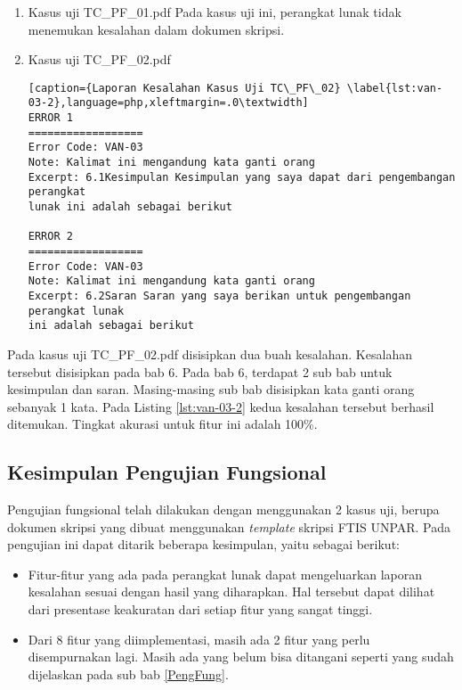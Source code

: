\begin{enumerate}
	\item Kasus uji TC\_PF\_01.pdf \newline
	Pada kasus uji ini, perangkat lunak tidak menemukan kesalahan dalam dokumen skripsi.
	
	\item Kasus uji TC\_PF\_02.pdf
	
\begin{lstlisting}[caption={Laporan Kesalahan Kasus Uji TC\_PF\_02}	\label{lst:van-03-2},language=php,xleftmargin=.0\textwidth]
ERROR 1
==================
Error Code: VAN-03
Note: Kalimat ini mengandung kata ganti orang
Excerpt: 6.1Kesimpulan Kesimpulan yang saya dapat dari pengembangan perangkat 
lunak ini adalah sebagai berikut

ERROR 2
==================
Error Code: VAN-03
Note: Kalimat ini mengandung kata ganti orang
Excerpt: 6.2Saran Saran yang saya berikan untuk pengembangan perangkat lunak 
ini adalah sebagai berikut
\end{lstlisting}
\end{enumerate}

Pada kasus uji TC\_PF\_02.pdf disisipkan dua buah kesalahan. Kesalahan tersebut disisipkan pada bab 6. Pada bab 6, terdapat 2 sub bab untuk kesimpulan dan saran. Masing-masing sub bab disisipkan kata ganti orang sebanyak 1 kata. Pada Listing \ref{lst:van-03-2} kedua kesalahan tersebut berhasil ditemukan. Tingkat akurasi untuk fitur ini adalah 100\%.

\subsection{Kesimpulan Pengujian Fungsional}

Pengujian fungsional telah dilakukan dengan menggunakan 2 kasus uji, berupa dokumen skripsi yang dibuat menggunakan \textit{template} skripsi FTIS UNPAR. Pada pengujian ini dapat ditarik beberapa kesimpulan, yaitu sebagai berikut:

\begin{itemize}
	\item Fitur-fitur yang ada pada perangkat lunak dapat mengeluarkan laporan kesalahan sesuai dengan hasil yang diharapkan. Hal tersebut dapat dilihat dari presentase keakuratan dari setiap fitur yang sangat tinggi.
	
	\item Dari 8 fitur yang diimplementasi, masih ada 2 fitur yang perlu disempurnakan lagi. Masih ada yang belum bisa ditangani seperti yang sudah dijelaskan pada sub bab \ref{PengFung}.
	
\end{itemize}

